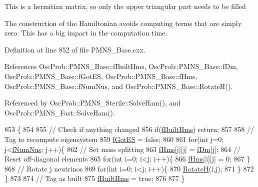 This is a hermitian matrix, so only the upper triangular part needs to be filled

The construction of the Hamiltonian avoids computing terms that are simply zero. This has a big impact in the computation time. 

Definition at line 852 of file P\+M\+N\+S\+\_\+\+Base.\+cxx.



References Osc\+Prob\+::\+P\+M\+N\+S\+\_\+\+Base\+::f\+Built\+Hms, Osc\+Prob\+::\+P\+M\+N\+S\+\_\+\+Base\+::f\+Dm, Osc\+Prob\+::\+P\+M\+N\+S\+\_\+\+Base\+::f\+Got\+ES, Osc\+Prob\+::\+P\+M\+N\+S\+\_\+\+Base\+::f\+Hms, Osc\+Prob\+::\+P\+M\+N\+S\+\_\+\+Base\+::f\+Num\+Nus, and Osc\+Prob\+::\+P\+M\+N\+S\+\_\+\+Base\+::\+Rotate\+H().



Referenced by Osc\+Prob\+::\+P\+M\+N\+S\+\_\+\+Sterile\+::\+Solve\+Ham(), and Osc\+Prob\+::\+P\+M\+N\+S\+\_\+\+Fast\+::\+Solve\+Ham().


\begin{DoxyCode}
853 \{
854 
855   \textcolor{comment}{// Check if anything changed}
856   \textcolor{keywordflow}{if}(\hyperlink{classOscProb_1_1PMNS__Base_a9ac3cadeac8db1b90f3152f476244780}{fBuiltHms}) \textcolor{keywordflow}{return};
857 
858   \textcolor{comment}{// Tag to recompute eigensystem}
859   \hyperlink{classOscProb_1_1PMNS__Base_a6dc5cd010d2d70b2324745b4e53e9839}{fGotES} = \textcolor{keyword}{false};
860 
861   \textcolor{keywordflow}{for}(\textcolor{keywordtype}{int} j=0; j<\hyperlink{classOscProb_1_1PMNS__Base_a24bb74bed63569dfe88b18fa6a08060e}{fNumNus}; j++)\{
862     \textcolor{comment}{// Set mass splitting}
863     \hyperlink{classOscProb_1_1PMNS__Base_adf5901166216e8c7a5cff2092952f473}{fHms}[j][j] = \hyperlink{classOscProb_1_1PMNS__Base_a406a31c3b5d620e5a0cace5b411f9f70}{fDm}[j];
864     \textcolor{comment}{// Reset off-diagonal elements}
865     \textcolor{keywordflow}{for}(\textcolor{keywordtype}{int} i=0; i<j; i++)\{
866       \hyperlink{classOscProb_1_1PMNS__Base_adf5901166216e8c7a5cff2092952f473}{fHms}[i][j] = 0;
867     \}
868     \textcolor{comment}{// Rotate j neutrinos}
869     \textcolor{keywordflow}{for}(\textcolor{keywordtype}{int} i=0; i<j; i++)\{
870       \hyperlink{classOscProb_1_1PMNS__Base_aae18afd69074211335f49ec40e6011b9}{RotateH}(i,j);
871     \}
872   \}
873 
874   \textcolor{comment}{// Tag as built}
875   \hyperlink{classOscProb_1_1PMNS__Base_a9ac3cadeac8db1b90f3152f476244780}{fBuiltHms} = \textcolor{keyword}{true};
876 
877 \}
\end{DoxyCode}
\mbox{\label{classOscProb_1_1PMNS__Base_aefe521239031c418cfaaaa550a6e13bb}} 
